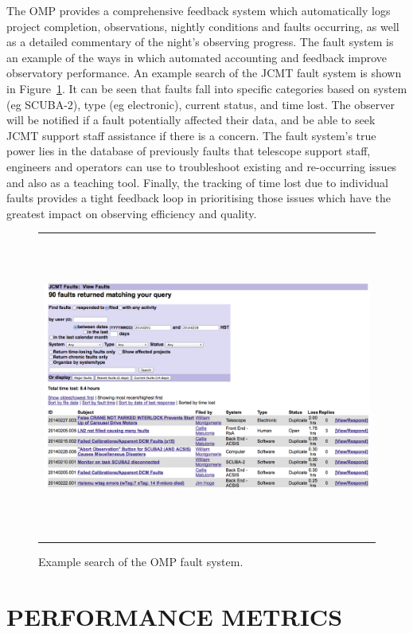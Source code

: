 \documentclass[]{spie}  %
\begin{document}
The OMP provides a comprehensive feedback system which automatically
logs project completion, observations, nightly conditions and faults
occurring, as well as a detailed commentary of the night's observing
progress. The fault system is an example of the ways in which
automated accounting and feedback improve observatory performance. An
example search of the JCMT fault system is shown in
Figure~\ref{fig:faulteg}. It can be seen that faults fall into
specific categories based on system (eg SCUBA-2), type (eg
electronic), current status, and time lost. The observer will be
notified if a fault potentially affected their data, and be able to
seek JCMT support staff assistance if there is a concern. The fault
system's true power lies in the database of previously faults that
telescope support staff, engineers and operators can use to
troubleshoot existing and re-occurring issues and also as a teaching
tool. Finally, the tracking of time lost due to individual faults
provides a tight feedback loop in prioritising those issues which have
the greatest impact on observing efficiency and quality.

 \begin{figure}[ht]
   \begin{center}
   \begin{tabular}{c}
   \includegraphics[height=10cm]{faultexample.png}
   \end{tabular}
   \end{center}
   \caption{\label{fig:faulteg}Example search of the OMP fault system.}
\end{figure}


\section{PERFORMANCE METRICS} \label{sec:metrics}
\end{document}
